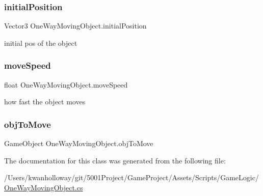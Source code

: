 \subsubsection{\texorpdfstring{initial\+Position}{initialPosition}}
{\footnotesize\ttfamily Vector3 One\+Way\+Moving\+Object.\+initial\+Position}



initial pos of the object 

\mbox{\label{class_one_way_moving_object_a57d03a6a88136b9c0a2fb931d3753fbd}} 
\subsubsection{\texorpdfstring{move\+Speed}{moveSpeed}}
{\footnotesize\ttfamily float One\+Way\+Moving\+Object.\+move\+Speed}



how fast the object moves 

\mbox{\label{class_one_way_moving_object_a738199df4fd9102323b3031b91f27cee}} 
\subsubsection{\texorpdfstring{obj\+To\+Move}{objToMove}}
{\footnotesize\ttfamily Game\+Object One\+Way\+Moving\+Object.\+obj\+To\+Move}



The documentation for this class was generated from the following file\+:\begin{DoxyCompactItemize}
\item 
/\+Users/kwanholloway/git/5001\+Project/\+Game\+Project/\+Assets/\+Scripts/\+Game\+Logic/\hyperlink{_one_way_moving_object_8cs}{One\+Way\+Moving\+Object.\+cs}\end{DoxyCompactItemize}
